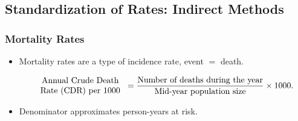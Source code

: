 \subsection{Standardization of Rates: Indirect Methods}
\subsubsection*{Mortality Rates}
\begin{itemize}
    \item Mortality rates are a type of incidence rate, event $ = $ death.
          \begin{Regular}
              \[ \begin{tabular}{c}
                      Annual Crude Death \\ Rate (CDR) per 1000
                  \end{tabular}=\frac{\text{Number of deaths during the year}}{\text{Mid-year population size}}\times 1000. \]
          \end{Regular}
    \item Denominator approximates person-years at risk.
\end{itemize}